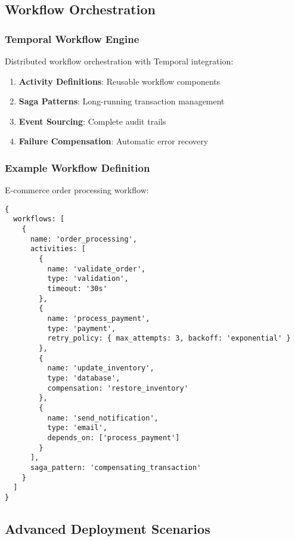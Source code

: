 \documentclass[11pt,a4paper]{article}
\begin{document}
\subsection{Workflow Orchestration}
\label{subsec:workflow_orchestration}

\subsubsection{Temporal Workflow Engine}
\label{subsubsec:temporal_workflow}

Distributed workflow orchestration with Temporal integration:

\begin{enumerate}
\item \textbf{Activity Definitions}: Reusable workflow components
\item \textbf{Saga Patterns}: Long-running transaction management
\item \textbf{Event Sourcing}: Complete audit trails
\item \textbf{Failure Compensation}: Automatic error recovery
\end{enumerate}

\subsubsection{Example Workflow Definition}
\label{subsubsec:workflow_example}

E-commerce order processing workflow:

\begin{lstlisting}[language=jsonnet,caption=E-commerce Workflow]
{
  workflows: [
    {
      name: 'order_processing',
      activities: [
        {
          name: 'validate_order',
          type: 'validation',
          timeout: '30s'
        },
        {
          name: 'process_payment',
          type: 'payment',
          retry_policy: { max_attempts: 3, backoff: 'exponential' }
        },
        {
          name: 'update_inventory',
          type: 'database',
          compensation: 'restore_inventory'
        },
        {
          name: 'send_notification',
          type: 'email',
          depends_on: ['process_payment']
        }
      ],
      saga_pattern: 'compensating_transaction'
    }
  ]
}
\end{lstlisting}

\subsection{Advanced Deployment Scenarios}
\label{subsec:deployment_scenarios}
\end{document}
